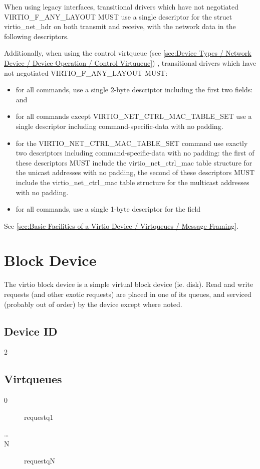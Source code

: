 When using legacy interfaces, transitional drivers which have not
negotiated VIRTIO_F_ANY_LAYOUT MUST use a single descriptor for the
struct virtio_net_hdr on both transmit and receive, with the
network data in the following descriptors.

Additionally, when using the control virtqueue (see \ref{sec:Device
Types / Network Device / Device Operation / Control Virtqueue})
, transitional drivers which have not
negotiated VIRTIO_F_ANY_LAYOUT MUST:
\begin{itemize}
\item for all commands, use a single 2-byte descriptor including the first two
fields:  and 
\item for all commands except VIRTIO_NET_CTRL_MAC_TABLE_SET
use a single descriptor including command-specific-data
with no padding.
\item for the VIRTIO_NET_CTRL_MAC_TABLE_SET command use exactly
two descriptors including command-specific-data with no padding:
the first of these descriptors MUST include the
virtio_net_ctrl_mac table structure for the unicast addresses with no padding,
the second of these descriptors MUST include the
virtio_net_ctrl_mac table structure for the multicast addresses
with no padding.
\item for all commands, use a single 1-byte descriptor for the
 field
\end{itemize}

See \ref{sec:Basic
Facilities of a Virtio Device / Virtqueues / Message Framing}.

\section{Block Device}\label{sec:Device Types / Block Device}

The virtio block device is a simple virtual block device (ie.
disk). Read and write requests (and other exotic requests) are
placed in one of its queues, and serviced (probably out of order) by the
device except where noted.

\subsection{Device ID}\label{sec:Device Types / Block Device / Device ID}
  2

\subsection{Virtqueues}\label{sec:Device Types / Block Device / Virtqueues}
\begin{description}
\item[0] requestq1
\item[\ldots]
\item[N] requestqN
\end{description}

